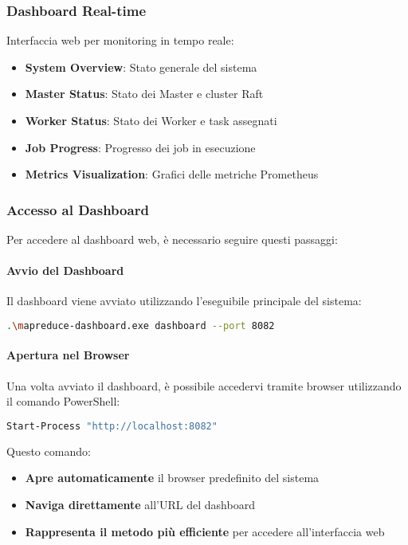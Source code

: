 \documentclass[12pt,a4paper]{article}
\begin{document}
\subsubsection{Dashboard Real-time}

Interfaccia web per monitoring in tempo reale:

\begin{itemize}
\item \textbf{System Overview}: Stato generale del sistema
\item \textbf{Master Status}: Stato dei Master e cluster Raft
\item \textbf{Worker Status}: Stato dei Worker e task assegnati
\item \textbf{Job Progress}: Progresso dei job in esecuzione
\item \textbf{Metrics Visualization}: Grafici delle metriche Prometheus
\end{itemize}

\subsubsection{Accesso al Dashboard}

Per accedere al dashboard web, è necessario seguire questi passaggi:

\paragraph{Avvio del Dashboard}
Il dashboard viene avviato utilizzando l'eseguibile principale del sistema:

\begin{lstlisting}[language=bash, caption=Comando per avviare il dashboard]
.\mapreduce-dashboard.exe dashboard --port 8082
\end{lstlisting}

\paragraph{Apertura nel Browser}
Una volta avviato il dashboard, è possibile accedervi tramite browser utilizzando il comando PowerShell:

\begin{lstlisting}[language=bash, caption=Comando per aprire il dashboard nel browser]
Start-Process "http://localhost:8082"
\end{lstlisting}

Questo comando:
\begin{itemize}
\item \textbf{Apre automaticamente} il browser predefinito del sistema
\item \textbf{Naviga direttamente} all'URL del dashboard
\item \textbf{Rappresenta il metodo più efficiente} per accedere all'interfaccia web
\end{itemize}
\end{document}
